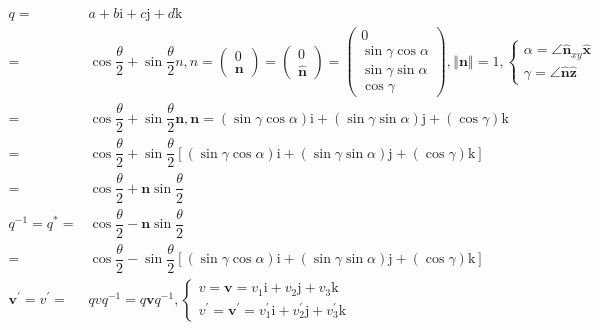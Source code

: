 \documentclass[
]{book}
\theoremstyle{definition}
\theoremstyle{definition}
\theoremstyle{definition}
\theoremstyle{definition}
\theoremstyle{remark}
\begin{document}
\[
\begin{aligned}
q= & a+b\mathrm{i}+c\mathrm{j}+d\mathrm{k}\\
= & \cos\dfrac{\theta}{2}+\sin\dfrac{\theta}{2}n,n=\begin{pmatrix}0\\
\boldsymbol{n}
\end{pmatrix}=\begin{pmatrix}0\\
\hat{\boldsymbol{n}}
\end{pmatrix}=\begin{pmatrix}0\\
\sin\gamma\cos\alpha\\
\sin\gamma\sin\alpha\\
\cos\gamma
\end{pmatrix},\left\Vert \boldsymbol{n}\right\Vert =1,\begin{cases}
\alpha=\angle\hat{\boldsymbol{n}}_{{\scriptscriptstyle xy}}\hat{\boldsymbol{x}}\\
\gamma=\angle\hat{\boldsymbol{n}}\hat{\boldsymbol{z}}
\end{cases}\\
= & \cos\dfrac{\theta}{2}+\sin\dfrac{\theta}{2}\boldsymbol{n},\boldsymbol{n}=\left(\sin\gamma\cos\alpha\right)\mathrm{i}+\left(\sin\gamma\sin\alpha\right)\mathrm{j}+\left(\cos\gamma\right)\mathrm{k}\\
= & \cos\dfrac{\theta}{2}+\sin\dfrac{\theta}{2}\left[\left(\sin\gamma\cos\alpha\right)\mathrm{i}+\left(\sin\gamma\sin\alpha\right)\mathrm{j}+\left(\cos\gamma\right)\mathrm{k}\right]\\
= & \cos\dfrac{\theta}{2}+\boldsymbol{n}\sin\dfrac{\theta}{2}\\
q^{-1}=q^{*}= & \cos\dfrac{\theta}{2}-\boldsymbol{n}\sin\dfrac{\theta}{2}\\
= & \cos\dfrac{\theta}{2}-\sin\dfrac{\theta}{2}\left[\left(\sin\gamma\cos\alpha\right)\mathrm{i}+\left(\sin\gamma\sin\alpha\right)\mathrm{j}+\left(\cos\gamma\right)\mathrm{k}\right]\\
\boldsymbol{v}^{\prime}=v^{\prime}= & qvq^{-1}=q\boldsymbol{v}q^{-1},\begin{cases}
v=\boldsymbol{v}=v_{{\scriptscriptstyle 1}}\mathrm{i}+v_{{\scriptscriptstyle 2}}\mathrm{j}+v_{{\scriptscriptstyle 3}}\mathrm{k}\\
v^{\prime}=\boldsymbol{v}^{\prime}=v_{{\scriptscriptstyle 1}}^{\prime}\mathrm{i}+v_{{\scriptscriptstyle 2}}^{\prime}\mathrm{j}+v_{{\scriptscriptstyle 3}}^{\prime}\mathrm{k}
\end{cases}\\

\end{aligned}\]
\end{document}
